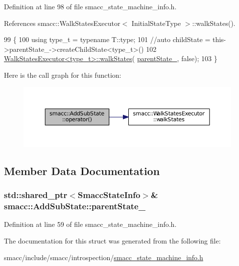 Definition at line 98 of file smacc\+\_\+state\+\_\+machine\+\_\+info.\+h.



References smacc\+::\+Walk\+States\+Executor$<$ Initial\+State\+Type $>$\+::walk\+States().


\begin{DoxyCode}
99 \{
100     \textcolor{keyword}{using} type\_t = \textcolor{keyword}{typename} T::type;
101     \textcolor{comment}{//auto childState = this->parentState\_->createChildState<type\_t>()}
102     \hyperlink{structsmacc_1_1WalkStatesExecutor_a11a2b02eafb62ec298bcf5ffbb32848b}{WalkStatesExecutor<type\_t>::walkStates}(
      \hyperlink{structsmacc_1_1AddSubState_a24aaa4e3dbe9722ce100f24b73207cd6}{parentState\_}, \textcolor{keyword}{false});
103 \}
\end{DoxyCode}


Here is the call graph for this function\+:
\nopagebreak
\begin{figure}[H]
\begin{center}
\leavevmode
\includegraphics[width=350pt]{structsmacc_1_1AddSubState_a24b6d9a40ca08289e36562d26f1b863c_cgraph}
\end{center}
\end{figure}




\subsection{Member Data Documentation}
\subsubsection[{\texorpdfstring{parent\+State\+\_\+}{parentState_}}]{\setlength{\rightskip}{0pt plus 5cm}std\+::shared\+\_\+ptr$<${\bf Smacc\+State\+Info}$>$\& smacc\+::\+Add\+Sub\+State\+::parent\+State\+\_\+}\hypertarget{structsmacc_1_1AddSubState_a24aaa4e3dbe9722ce100f24b73207cd6}{}\label{structsmacc_1_1AddSubState_a24aaa4e3dbe9722ce100f24b73207cd6}


Definition at line 59 of file smacc\+\_\+state\+\_\+machine\+\_\+info.\+h.



The documentation for this struct was generated from the following file\+:\begin{DoxyCompactItemize}
\item 
smacc/include/smacc/introspection/\hyperlink{smacc__state__machine__info_8h}{smacc\+\_\+state\+\_\+machine\+\_\+info.\+h}\end{DoxyCompactItemize}
